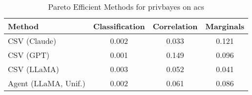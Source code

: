 \begin{table}[t!]
    \centering
    \caption{Pareto Efficient Methods for privbayes on acs}
    \label{tab:pareto_efficient_methods_privbayes_acs}
    \begin{tabular}{lccc}
    \toprule
    Method & Classification & Correlation & Marginals \\
    \midrule
    CSV (Claude) & \cellcolor{silver!30}0.002 & \cellcolor{gold!30}0.033 & 0.121 \\
    CSV (GPT) & \cellcolor{gold!30}0.001 & 0.149 & \cellcolor{bronze!30}0.096 \\
    CSV (LLaMA) & 0.003 & \cellcolor{silver!30}0.052 & \cellcolor{gold!30}0.041 \\
    Agent (LLaMA, Unif.) & \cellcolor{bronze!30}0.002 & \cellcolor{bronze!30}0.061 & \cellcolor{silver!30}0.086 \\
    \bottomrule
    \end{tabular}
\end{table}
